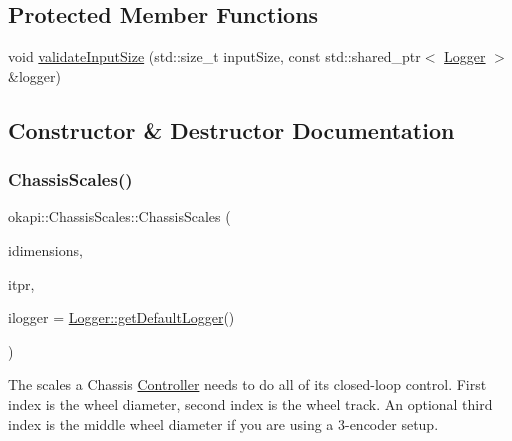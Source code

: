 \subsection*{Protected Member Functions}
\begin{DoxyCompactItemize}
\item 
void \mbox{\hyperlink{classokapi_1_1ChassisScales_a74052e85cf75704579b3dca6718acd87}{validate\+Input\+Size}} (std\+::size\+\_\+t input\+Size, const std\+::shared\+\_\+ptr$<$ \mbox{\hyperlink{classokapi_1_1Logger}{Logger}} $>$ \&logger)
\end{DoxyCompactItemize}


\subsection{Constructor \& Destructor Documentation}
\mbox{\label{classokapi_1_1ChassisScales_a12c534b3782cabe8fcfc12620ceb5b7e}} 
\subsubsection{\texorpdfstring{ChassisScales()}{ChassisScales()}\hspace{0.1cm}{\footnotesize\ttfamily [1/2]}}
{\footnotesize\ttfamily okapi\+::\+Chassis\+Scales\+::\+Chassis\+Scales (\begin{DoxyParamCaption}\item[{const std\+::initializer\+\_\+list$<$ Q\+Length $>$ \&}]{idimensions,  }\item[{std\+::int32\+\_\+t}]{itpr,  }\item[{const std\+::shared\+\_\+ptr$<$ \mbox{\hyperlink{classokapi_1_1Logger}{Logger}} $>$ \&}]{ilogger = {\ttfamily \mbox{\hyperlink{classokapi_1_1Logger_a5053cf778b4b55acba788a3797dc96d2}{Logger\+::get\+Default\+Logger}}()} }\end{DoxyParamCaption})}

The scales a Chassis \mbox{\hyperlink{classokapi_1_1Controller}{Controller}} needs to do all of its closed-\/loop control. First index is the wheel diameter, second index is the wheel track. An optional third index is the middle wheel diameter if you are using a 3-\/encoder setup.

